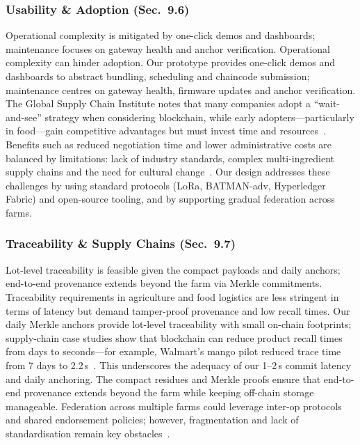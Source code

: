 \documentclass[12pt,onecolumn]{IEEEtran} %
\begin{document}
\subsubsection{Usability \& Adoption (Sec.~9.6)}
Operational complexity is mitigated by one-click demos and dashboards; maintenance focuses on gateway health and anchor verification. Operational complexity can hinder adoption. Our prototype provides one-click demos and dashboards to abstract bundling, scheduling and chaincode submission; maintenance centres on gateway health, firmware updates and anchor verification. The Global Supply Chain Institute notes that many companies adopt a “wait-and-see” strategy when considering blockchain, while early adopters—particularly in food—gain competitive advantages but must invest time and resources~\cite{gsci_blockchain_supplychain_2022}. Benefits such as reduced negotiation time and lower administrative costs are balanced by limitations: lack of industry standards, complex multi-ingredient supply chains and the need for cultural change~\cite{gsci_blockchain_supplychain_2022}. Our design addresses these challenges by using standard protocols (LoRa, BATMAN-adv, Hyperledger Fabric) and open-source tooling, and by supporting gradual federation across farms.

\subsubsection{Traceability \& Supply Chains (Sec.~9.7)}
Lot-level traceability is feasible given the compact payloads and daily anchors; end-to-end provenance extends beyond the farm via Merkle commitments. Traceability requirements in agriculture and food logistics are less stringent in terms of latency but demand tamper-proof provenance and low recall times. Our daily Merkle anchors provide lot-level traceability with small on-chain footprints; supply-chain case studies show that blockchain can reduce product recall times from days to seconds—for example, Walmart’s mango pilot reduced trace time from 7 days to 2.2\,s~\cite{hyperledger_walmart_2020}. This underscores the adequacy of our 1–2\,s commit latency and daily anchoring. The compact residues and Merkle proofs ensure that end-to-end provenance extends beyond the farm while keeping off-chain storage manageable. Federation across multiple farms could leverage inter-op protocols and shared endorsement policies; however, fragmentation and lack of standardisation remain key obstacles~\cite{gsci_blockchain_supplychain_2022}.
\end{document}
